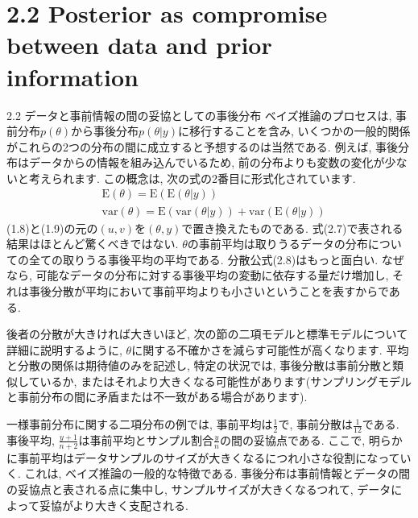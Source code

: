 \documentclass[10pt,dvipdfmx,a4]{beamer}
\newcommand{\eq}[1]{\begin{align}#1\end{align}}
\begin{document}
\section{2.2 Posterior as compromise between data and prior information}
\begin{frame}{2.2 データと事前情報の間の妥協としての事後分布}
ベイズ推論のプロセスは, 事前分布$p(\theta)$から事後分布$p(\theta|y)$に移行することを含み, いくつかの一般的関係がこれらの2つの分布の間に成立すると予想するのは当然である.
例えば, 事後分布はデータからの情報を組み込んでいるため, 前の分布よりも変数の変化が少ないと考えられます.
この概念は, 次の式の2番目に形式化されています.
\eq{&\text{E}(\theta)=\text{E}(\text{E}(\theta|y))\\
&\text{var}(\theta)=\text{E}(\text{var}(\theta|y))+\text{var}(\text{E}(\theta|y))}
(1.8)と(1.9)の元の$(u, v)$を$(\theta, y)$で置き換えたものである.
式(2.7)で表される結果はほとんど驚くべきではない.
$\theta$の事前平均は取りうるデータの分布についての全ての取りうる事後平均の平均である.
分散公式(2.8)はもっと面白い.
なぜなら, 可能なデータの分布に対する事後平均の変動に依存する量だけ増加し, それは事後分散が平均において事前平均よりも小さいということを表すからである.
\end{frame}


\begin{frame}
後者の分散が大きければ大きいほど, 次の節の二項モデルと標準モデルについて詳細に説明するように, $\theta$に関する不確かさを減らす可能性が高くなります.
平均と分散の関係は期待値のみを記述し, 特定の状況では, 事後分散は事前分散と類似しているか, またはそれより大きくなる可能性があります(サンプリングモデルと事前分布の間に矛盾または不一致がある場合があります).

一様事前分布に関する二項分布の例では, 事前平均は$\tfrac{1}{2}$で, 事前分散は$\tfrac{1}{12}$である.
事後平均, $\tfrac{y+1}{n+2}$は事前平均とサンプル割合$\tfrac{y}{n}$の間の妥協点である.
ここで, 明らかに事前平均はデータサンプルのサイズが大きくなるにつれ小さな役割になっていく.
これは, ベイズ推論の一般的な特徴である.
事後分布は事前情報とデータの間の妥協点と表される点に集中し, サンプルサイズが大きくなるつれて, データによって妥協がより大きく支配される.
\end{frame}

\end{document}
